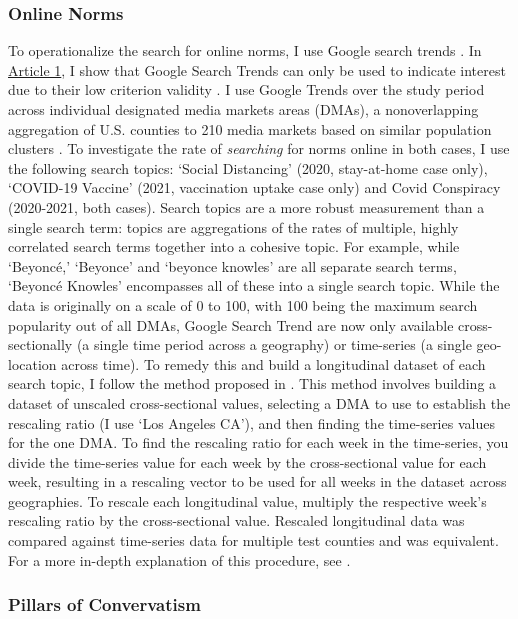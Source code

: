 \hypertarget{online-norms}{\subsubsection{Online Norms}\label{online-norms}}

To operationalize the search for online norms, I use Google search trends
\citep{googletrends}. In \hyperlink{paper-1}{Article 1}, I show
that Google Search Trends can only be used to indicate interest due to their low
criterion validity \citep{jungherr_etal17}. I use Google Trends over the study
period across individual designated media markets areas (DMAs), a nonoverlapping
aggregation of U.S. counties to 210 media markets based on similar population
clusters \citep{dma_key}. To investigate the rate of \emph{searching} for norms
online in both cases, I use the following search topics: `Social Distancing'
(2020, stay-at-home case only), `COVID-19 Vaccine' (2021, vaccination uptake
case only) and Covid Conspiracy (2020-2021, both cases). Search topics are a
more robust measurement than a single search term: topics are aggregations of
the rates of multiple, highly correlated search terms together into a cohesive
topic. For example, while `Beyoncé,' `Beyonce' and `beyonce knowles' are all
separate search terms, `Beyoncé Knowles' encompasses all of these into a single
search topic. While the data is originally on a scale of 0 to 100, with 100
being the maximum search popularity out of all DMAs, Google Search Trend are now
only available cross-sectionally (a single time period across a geography) or
time-series (a single geo-location across time). To remedy this and build a
longitudinal dataset of each search topic, I follow the method proposed in
\citet[p. 5]{park_etal}. This method involves building a dataset of unscaled
cross-sectional values, selecting a DMA to use to establish the rescaling ratio
(I use `Los Angeles CA'), and then finding the time-series values for the one
DMA. To find the rescaling ratio for each week in the time-series, you divide
the time-series value for each week by the cross-sectional value for each week,
resulting in a rescaling vector to be used for all weeks in the dataset across
geographies. To rescale each longitudinal value, multiply the respective week's
rescaling ratio by the cross-sectional value. Rescaled longitudinal data was
compared against time-series data for multiple test counties and was equivalent.
For a more in-depth explanation of this procedure, see \citet[p. 5]{park_etal}.

\hypertarget{pillars-of-convervatism}{\subsubsection{Pillars of Convervatism}\label{pillars-of-convervatism}}

